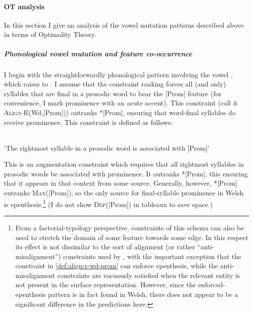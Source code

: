 \paragraph{OT analysis}
\label{sec:ot-analysis}

In this section I give an analysis of the vowel mutation patterns described above in terms of Optimality Theory.

\subparagraph{Phonological vowel mutation and feature co-occurrence}
\label{sec:phon-vowel-mutat}

I begin with the straightforwardly phonological pattern involving the vowel , which raises to \ipa{[i]}. I assume that the constraint ranking forces all (and only) syllables that are final in a prosodic word to bear the [Prom] feature (for convenience, I mark prominence with an acute accent). This constraint (call it \textsc{Align-R}(Wd,[Prom])) outranks *[Prom], ensuring that word-final syllables do receive prominence. This constraint is defined as follows:

\begin{constraint}
\label{def:align-r-wd-prom}
\\
`The rightmost syllable in a prosodic word is associated with [Prom]'
\end{constraint}

This is an augmentation constraint which requires that all rightmost syllables in prosodic words be associated with prominence. It outranks *[Prom], this ensuring that it appears in that context from some source. Generally, however, *[Prom] outranks \textsc{Max}([Prom]), so the only source for final\hyp syllable prominence in Welsh is epenthesis.\footnote{From a factorial\hyp typology perspective, constraints of this schema can also be used to stretch the domain of some feature towards some edge. In this respect its effect is not dissimilar to the sort of alignment (or rather \enquote{anti\hyp misalignment}) constraints used by \citealp{hyde08:_align_contin,hyde12:_align,jurgec10:_featur_spread}, with the important exception that the constraint in \cref{def:align-r-wd-prom} can enforce epenthesis, while the anti\hyp misalignment constraints are vacuously satisfied when the relevant entity is not present in the surface representation. However, since the enforced\hyp epenthesis pattern is in fact found in Welsh, there does not appear to be a significant difference in the predictions here.} (I do not show \textsc{Dep}([Prom]) in tableaux to save space.)

